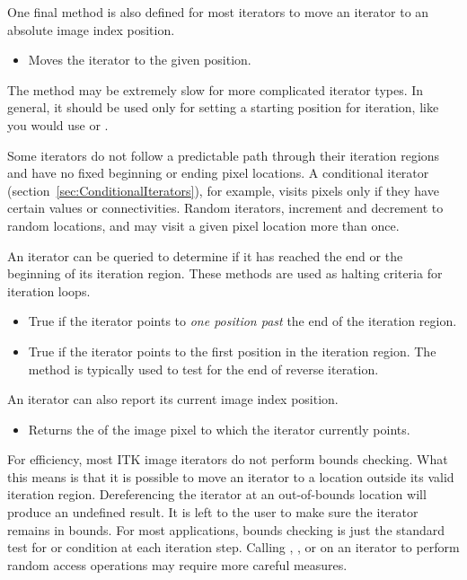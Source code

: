 One final method is also defined for most iterators to move an iterator to an
absolute image index position.

\begin{itemize}
\item \textbf{} Moves the iterator to the given
 position.
\end{itemize}

The  method may be extremely slow for more complicated
iterator types. In general, it should be used only for setting a starting
position for iteration, like you would use  or
. 

Some iterators do not follow a predictable path through their iteration regions
and have no fixed beginning or ending pixel locations.  A conditional iterator
(section~\ref{sec:ConditionalIterators}), for example, visits pixels only if
they have certain values or connectivities.  Random iterators, increment and
decrement to random locations, and may visit a given pixel location more than
once.

An iterator can be queried to determine if it has reached the end or the
beginning of its iteration region.  These methods are used as halting criteria
for iteration loops.

\begin{itemize}
\item \textbf{} True if the iterator points to \emph{one
position past} the end of the iteration region.

\item \textbf{} True if the iterator points to the first
position in the iteration region.  The method is typically used to test for the
end of reverse iteration.

\end{itemize}

An iterator can also report its current image index position.

\begin{itemize}
\item \textbf{} Returns the 
of the image pixel to which the iterator currently points.
\end{itemize}

For efficiency, most ITK image iterators do not perform bounds checking.  What
this means is that it is possible to move an iterator to a location outside its
valid iteration region.  Dereferencing the iterator at an out-of-bounds location
will produce an undefined result. It is left to the user to make sure the
iterator remains in bounds.  For most applications,  bounds checking is just
the standard test for  or  condition at each
iteration step.  Calling ,  , or
 on an iterator to perform random access operations may
require more careful measures. 

